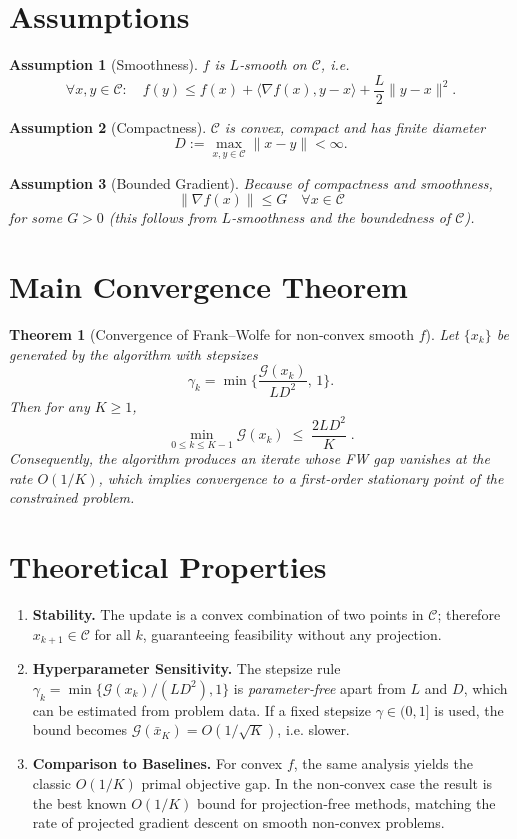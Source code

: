 \documentclass{article}
\newtheorem{theorem}{Theorem}
\newtheorem{assumption}{Assumption}
\newcommand{\gap}{\mathcal{G}}
\begin{document}
\section*{Assumptions}
\begin{assumption}[Smoothness]\label{as:Lsmooth}
$f$ is $L$‑smooth on $\mathcal{C}$, i.e.
\[
\forall x,y\in\mathcal{C}:\quad
f(y)\le f(x)+\langle\nabla f(x),y-x\rangle+\frac{L}{2}\|y-x\|^2 .
\]
\end{assumption}
\begin{assumption}[Compactness]\label{as:compact}
$\mathcal{C}$ is convex, compact and has finite diameter
\[
D:=\max_{x,y\in\mathcal{C}}\|x-y\|<\infty .
\]
\end{assumption}
\begin{assumption}[Bounded Gradient]\label{as:gradbound}
Because of compactness and smoothness,
\[
\|\nabla f(x)\|\le G \quad\forall x\in\mathcal{C}
\]
for some $G>0$ (this follows from $L$‑smoothness and the boundedness of
$\mathcal{C}$).
\end{assumption}

\section*{Main Convergence Theorem}
\begin{theorem}[Convergence of Frank–Wolfe for non‑convex smooth $f$]\label{thm:fw}
Let $\{x_k\}$ be generated by the algorithm with stepsizes
\[
\gamma_k = \min\!\Big\{\frac{\gap(x_k)}{L D^{2}},\,1\Big\}.
\]
Then for any $K\ge 1$,
\[
\min_{0\le k\le K-1}\gap(x_k)
\;\le\;
\frac{2L D^{2}}{K}\; .
\tag{3}
\]
Consequently, the algorithm produces an iterate whose FW gap
vanishes at the rate $O(1/K)$, which implies convergence to a first‑order
stationary point of the constrained problem.
\end{theorem}

\section*{Theoretical Properties}
\begin{enumerate}[label=\arabic*.]
\item \textbf{Stability.} The update is a convex combination of two points in
$\mathcal{C}$; therefore $x_{k+1}\in\mathcal{C}$ for all $k$, guaranteeing
feasibility without any projection.
\item \textbf{Hyperparameter Sensitivity.} The stepsize rule
$\gamma_k=\min\{\gap(x_k)/(L D^{2}),1\}$ is \emph{parameter‑free}
apart from $L$ and $D$, which can be estimated from problem data.
If a fixed stepsize $\gamma\in(0,1]$ is used, the bound becomes
$\gap(\bar{x}_K)=O(1/\sqrt{K})$, i.e. slower.
\item \textbf{Comparison to Baselines.}
For convex $f$, the same analysis yields the classic $O(1/K)$ primal
objective gap.  In the non‑convex case the result is the best known
$O(1/K)$ bound for projection‑free methods, matching the rate of
projected gradient descent on smooth non‑convex problems.
\end{enumerate}
\end{document}
